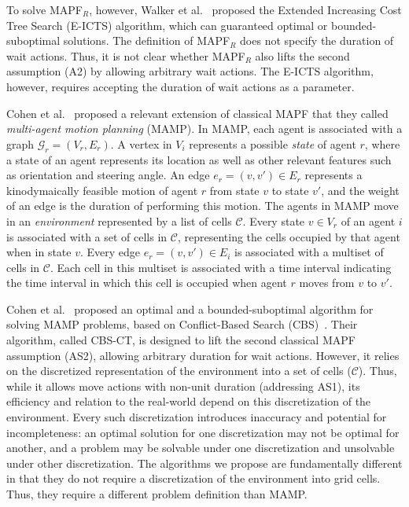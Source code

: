 \documentclass[review]{elsarticle}
\newcommand{\mapfr}{\ac{MAPF}$_R$\xspace}
\newcommand{\mapf}{\ac{MAPF}\xspace}
\begin{document}
To solve \mapfr, however, Walker et al.~\cite{walker2018extended} proposed the Extended Increasing Cost Tree Search (E-ICTS) algorithm, which can guaranteed  optimal or  bounded-suboptimal solutions. 
The definition of \mapfr does not specify the duration of wait actions. 
Thus, it is not clear whether \mapfr also lifts the second assumption (A2) by allowing arbitrary wait actions. The E-ICTS algorithm, however, requires accepting the duration of wait actions as a parameter. 



Cohen et al.~\cite{cohen2019optimal} proposed a relevant extension of classical \mapf that they called \emph{multi-agent motion planning} (MAMP).  In MAMP, each agent is associated with a graph $\mathcal{G}_r=(V_r,E_r)$. 
A vertex in $V_i$ represents a possible \emph{state} of agent $r$, where a state of an agent represents its location as well as other relevant features such as orientation and steering angle. 
An edge $e_r=(v,v')\in E_r$ represents a kinodymaically feasible motion of agent $r$ from state $v$ to state $v'$, 
and the weight of an edge is the duration of performing this motion.
The agents in MAMP move in an \emph{environment} represented by a list of cells $\mathcal{C}$. 
Every state $v\in V_r$ of an agent $i$ is associated with a set of cells in $\mathcal{C}$, representing the cells occupied by that agent when in state $v$. 
Every edge $e_r=(v,v')\in E_i$ is associated with a multiset of cells in $\mathcal{C}$. 
Each cell in this multiset is associated with a time interval indicating the time interval in which this cell is occupied when agent $r$ moves from $v$ to $v'$.

Cohen et al.~\cite{cohen2019optimal} proposed an optimal and a bounded-suboptimal algorithm for solving MAMP problems, based on Conflict-Based Search (CBS)~\cite{sharon2015conflict}. Their algorithm, called CBS-CT, is designed to lift the second classical \mapf assumption (AS2), allowing arbitrary duration for wait actions. 
However, it relies on the discretized representation of the environment into a set of cells ($\mathcal{C}$). Thus, while it allows move actions with non-unit duration (addressing AS1), its efficiency and relation to the real-world depend on this discretization of the environment. Every such discretization introduces inaccuracy and potential for incompleteness: an optimal solution for one discretization may not be optimal for another, and a problem may be solvable under one discretization and unsolvable under other discretization.  
The algorithms we propose are fundamentally different in that they do not require a discretization of the environment into grid cells.  Thus, they require a different problem definition than MAMP. 
\end{document}
